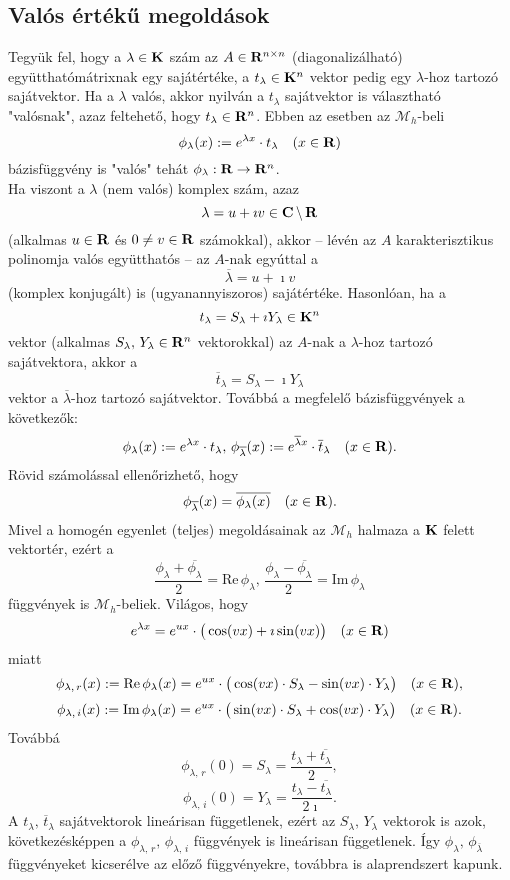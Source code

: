 \subsection{Valós értékű megoldások}
Tegyük fel, hogy a $\lambda \in \mathbf{K}$ szám az $A \in \mathbf{R}^{n \times n}$ (diagonalizálható) együtthatómátrixnak egy sajátértéke, a $t_\lambda \in \mathbf{K}^n$ vektor pedig egy $\lambda$-hoz tartozó sajátvektor. Ha a $\lambda$ valós, akkor nyilván a $t_\lambda$ sajátvektor is választható "valósnak", azaz feltehető, hogy $t_\lambda \in \mathbf{R}^n$. Ebben az esetben az $\mathcal{M}_h$-beli
\[
	\phi_\lambda(x) := e^{\lambda x} \cdot t_\lambda \quad (x \in \mathbf{R})
\]
bázisfüggvény is "valós" tehát $\phi_\lambda : \mathbf{R} \to \mathbf{R}^n$.\\

Ha viszont a $\lambda$ (nem valós) komplex szám, azaz
\[
	\lambda = u + \imath v \in \mathbf{C} \, \backslash \, \mathbf{R}
\]
(alkalmas $u \in \mathbf{R}$ és $0 \neq v \in \mathbf{R}$ számokkal), akkor -- lévén az $A$ karakterisztikus polinomja valós együtthatós -- az $A$-nak egyúttal a
\[
	\overline{\lambda} = u + \imath v
\]
(komplex konjugált) is (ugyanannyiszoros) sajátértéke. Hasonlóan, ha a
\[
	t_\lambda = S_\lambda + \imath Y_\lambda \in \mathbf{K}^n
\]
vektor (alkalmas $S_\lambda, \, Y_\lambda \in \mathbf{R}^n$ vektorokkal) az $A$-nak a $\lambda$-hoz tartozó sajátvektora, akkor a
\[
	\overline{t}_\lambda = S_\lambda - \imath Y_\lambda
\]
vektor a $\overline{\lambda}$-hoz tartozó sajátvektor. Továbbá a megfelelő bázisfüggvények a következők:
\[
	\phi_\lambda(x) := e^{\lambda x} \cdot t_\lambda, \, \phi_{\overline{\lambda}}(x) := e^{\overline{\lambda}x} \cdot \overline{t}_\lambda \quad (x \in \mathbf{R}).
\]
Rövid számolással ellenőrizhető, hogy
\[
	\phi_{\overline{\lambda}}(x) = \overline{\phi_\lambda(x)} \quad (x \in \mathbf{R}).
\]
Mivel a homogén egyenlet (teljes) megoldásainak az $\mathcal{M}_h$ halmaza a $\mathbf{K}$ felett vektortér, ezért a
\[
	\frac{\phi_\lambda + \overline{\phi_\lambda}}{2} = \text{Re}\, \phi_\lambda, \, \frac{\phi_\lambda - \overline{\phi_\lambda}}{2} = \text{Im} \, \phi_\lambda
\]
függvények is $\mathcal{M}_h$-beliek. Világos, hogy
\[
	e^{\lambda x} = e^{u x} \cdot \big(  \cos(vx) + \imath \sin(vx)  \big) \quad (x \in \mathbf{R})
\]
miatt
\[
	\phi_{\lambda, \, r}(x) := \text{Re} \, \phi_\lambda(x) = e^{ux} \cdot \big(  \cos(vx) \cdot S_\lambda - \sin(vx) \cdot Y_\lambda  \big) \quad (x \in \mathbf{R}),
\]
\[
	\phi_{\lambda, \, i}(x) := \text{Im} \, \phi_\lambda(x) = e^{ux} \cdot \big(  \sin(vx) \cdot S_\lambda + \cos(vx) \cdot Y_\lambda  \big) \quad (x \in \mathbf{R}).
\]
Továbbá
\[
	\phi_{\lambda, \, r}(0) = S_\lambda = \frac{t_\lambda + \overline{t_\lambda}}{2},
\]
\[
	\phi_{\lambda, \, i}(0) = Y_\lambda = \frac{t_\lambda - \overline{t_\lambda}}{2 \imath}.
\]
A $t_\lambda, \, \overline{t}_\lambda$ sajátvektorok lineárisan függetlenek, ezért az $S_\lambda, \, Y_\lambda$ vektorok is azok, következésképpen a $\phi_{\lambda, \, r}, \, \phi_{\lambda, \, i}$ függvények is lineárisan függetlenek. Így $\phi_\lambda, \, \phi_{\overline{\lambda}}$ függvényeket kicserélve az előző függvényekre, továbbra is alaprendszert kapunk.
